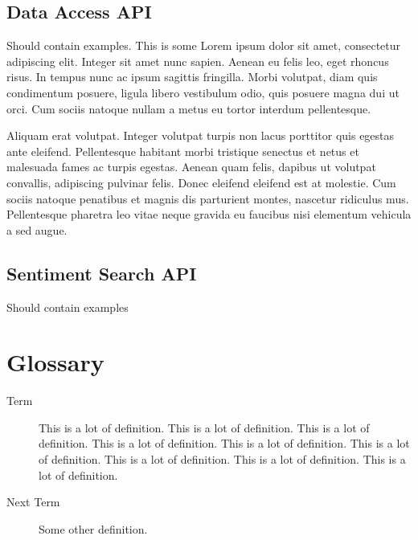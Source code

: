 \documentclass[titlepage]{article}
\begin{document}
\subsection{Data Access API}
Should contain examples. This is some
Lorem ipsum dolor sit amet, consectetur adipiscing elit. Integer sit amet nunc
sapien. Aenean eu felis leo, eget rhoncus risus. In tempus nunc ac ipsum
sagittis fringilla. Morbi volutpat, diam quis condimentum posuere, ligula
libero vestibulum odio, quis posuere magna dui ut orci. Cum sociis natoque
nullam a metus eu tortor interdum pellentesque.

Aliquam erat volutpat. Integer volutpat turpis non lacus porttitor quis
egestas ante eleifend. Pellentesque habitant morbi tristique senectus et netus
et malesuada fames ac turpis egestas. Aenean quam felis, dapibus ut volutpat
convallis, adipiscing pulvinar felis. Donec eleifend eleifend est at molestie.
Cum sociis natoque penatibus et magnis dis parturient montes, nascetur
ridiculus mus. Pellentesque pharetra leo vitae neque gravida eu faucibus nisi
elementum vehicula a sed augue.

\subsection{Sentiment Search API}
Should contain examples

\section{Glossary}
\begin{description}
\item[Term] 
This is a lot of definition. This is a lot of definition. This is
a lot of definition. This is a lot of definition. This is a lot of definition.
This is a lot of definition. This is a lot of definition. This is a lot of
definition. This is a lot of definition.
\item[Next Term] Some other definition.
\end{description}
\end{document}
